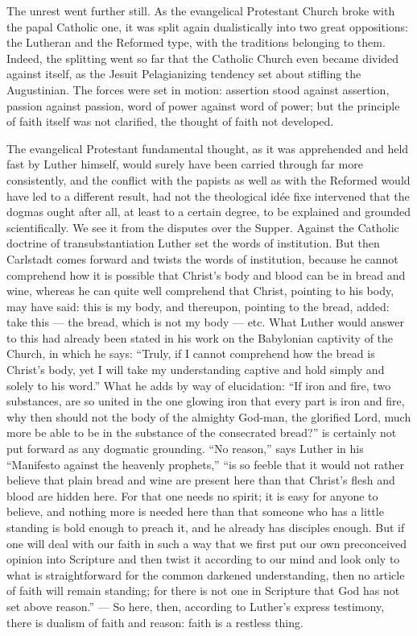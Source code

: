 \documentclass[12pt]{book}
\newcommand{\opage}[1]{\marginnote{\footnotesize\textit{[#1]}}}
\begin{document}
The unrest went further still. As the evangelical Protestant Church broke with
the papal Catholic one, it was split again dualistically into two great
oppositions: the Lutheran and the Reformed type, with the traditions belonging
to them. Indeed, the splitting went so far that the Catholic Church even
became divided against itself, as the Jesuit Pelagianizing tendency set about
stifling the Augustinian. The forces were set in motion: assertion stood
against assertion, passion against passion, word of power against word of
power; but the principle of faith itself was not clarified, the thought of
faith not developed.

The evangelical Protestant fundamental thought, as it was apprehended and held
fast by Luther himself, would surely have been carried through far more
consistently, and the conflict with the papists as well as with the Reformed
would have led to a different result, had not the theological idée fixe
intervened that the dogmas ought after all, at least to a certain degree, to
be explained and grounded scientifically. We see it from the disputes over the
Supper. Against the Catholic doctrine of transubstantiation Luther set the
words of institution. But then Carlstadt comes forward and twists the words of
institution, because he cannot comprehend how it is possible that Christ's
body and blood can be in bread and wine, whereas he can quite well comprehend
that Christ, pointing to his body, may have said: this is my body, and
thereupon, pointing to the bread, added: take this --- the bread, which is not
my body --- etc. What Luther would answer to this had already been stated in
his work on the Babylonian captivity of the Church, in which he says: ``Truly,
if I cannot comprehend how the bread is Christ's body, yet I will take my
understanding captive and hold simply and solely to his word.'' What he adds
by way of
\opage{266}\setcounter{footnote}{0}%
elucidation: ``If iron and fire, two substances, are so united in the one
glowing iron that every part is iron and fire, why then should not the body of
the almighty God-man, the glorified Lord, much more be able to be in the
substance of the consecrated bread?'' is certainly not put forward as any
dogmatic grounding. ``No reason,'' says Luther in his ``Manifesto against the
heavenly prophets,'' ``is so feeble that it would not rather believe that
plain bread and wine are present here than that Christ's flesh and blood are
hidden here. For that one needs no spirit; it is easy for anyone to believe,
and nothing more is needed here than that someone who has a little standing is
bold enough to preach it, and he already has disciples enough. But if one will
deal with our faith in such a way that we first put our own preconceived
opinion into Scripture and then twist it according to our mind and look only
to what is straightforward for the common darkened understanding, then no
article of faith will remain standing; for there is not one in Scripture that
God has not set above reason.'' --- So here, then, according to Luther's
express testimony, there is dualism of faith and reason: faith is a restless
thing.
\end{document}
